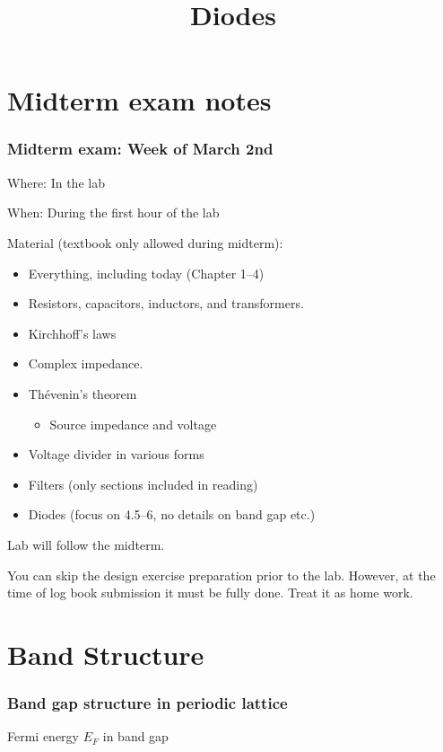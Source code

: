 \documentclass[beamer]{standalone}
\begin{document}
\title[Electronics 1]{Diodes}

\begin{frame} 
  \titlepage
\end{frame}


\section{Midterm exam notes}
\begin{frame}
 \frametitle{Midterm exam: Week of March 2nd}
  Where: In the lab

  When: During the first hour of the lab

  Material (\alert{textbook only} allowed during midterm): 
  \begin{itemize}
    \item Everything, including today (Chapter 1--4)
    \item Resistors, capacitors, inductors, and transformers.
    \item Kirchhoff's laws
    \item Complex impedance.
    \item Th\'{e}venin's theorem
      \begin{itemize}
        \item Source impedance and voltage
      \end{itemize}
    \item Voltage divider in various forms
    \item Filters (only sections included in reading)
    \item Diodes (focus on 4.5--6, no details on band gap etc.)
  \end{itemize}

  \alert{Lab will follow the midterm.}

  You can skip the design exercise preparation prior to the lab. However, at the time of log book submission it must be fully done. Treat it as home work.
\end{frame}
  
\section{Band Structure}
\begin{frame}[t]
 \frametitle{Band gap structure in periodic lattice}
 \begin{block}{Fermi energy $E_F$ in band gap}
  \begin{center}
  \end{center}
 \end{block}
\end{frame}
\end{document}
